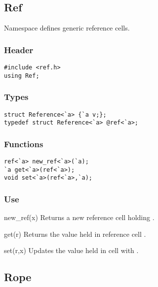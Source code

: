 \subsection{Ref}

Namespace  defines generic reference cells.

\subsubsection*{Header}
\begin{verbatim}
#include <ref.h>
using Ref;
\end{verbatim}

\subsubsection*{Types}
\begin{verbatim}
struct Reference<`a> {`a v;};
typedef struct Reference<`a> @ref<`a>;
\end{verbatim}

\subsubsection*{Functions}
\begin{verbatim}
ref<`a> new_ref<`a>(`a);
`a get<`a>(ref<`a>);
void set<`a>(ref<`a>,`a);
\end{verbatim}

\subsubsection*{Use}

\begin{defun}{new_ref}{(x)}
Returns a new reference cell holding .
\end{defun}

\begin{defun}{get}{(r)}
Returns the value held in reference cell .
\end{defun}

\begin{defun}{set}{(r,x)}
Updates the value held in cell  with .
\end{defun}

\subsection{Rope}

